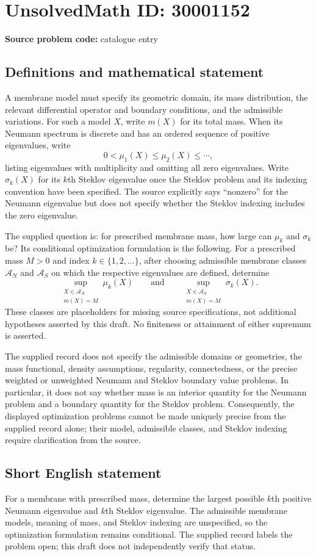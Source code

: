 \documentclass[11pt]{article}
\begin{document}
\section*{UnsolvedMath ID: 30001152}
\textbf{Source problem code:} catalogue entry
\subsection{Definitions and mathematical statement}
A membrane model must specify its geometric domain, its mass distribution, the relevant differential operator and boundary conditions, and the admissible variations. For such a model \(X\), write \(m(X)\) for its total mass. When its Neumann spectrum is discrete and has an ordered sequence of positive eigenvalues, write
\[
0<\mu_1(X)\leq\mu_2(X)\leq\cdots,
\]
listing eigenvalues with multiplicity and omitting all zero eigenvalues. Write \(\sigma_k(X)\) for its \(k\)th Steklov eigenvalue once the Steklov problem and its indexing convention have been specified. The source explicitly says ``nonzero'' for the Neumann eigenvalue but does not specify whether the Steklov indexing includes the zero eigenvalue.

The supplied question is: for prescribed membrane mass, how large can \(\mu_k\) and \(\sigma_k\) be? Its conditional optimization formulation is the following. For a prescribed mass \(M>0\) and index \(k\in\{1,2,\ldots\}\), after choosing admissible membrane classes \(\mathcal A_N\) and \(\mathcal A_S\) on which the respective eigenvalues are defined, determine
\[
\sup_{\substack{X\in\mathcal A_N\\m(X)=M}}\mu_k(X)
\qquad\text{and}\qquad
\sup_{\substack{X\in\mathcal A_S\\m(X)=M}}\sigma_k(X).
\]
These classes are placeholders for missing source specifications, not additional hypotheses asserted by this draft. No finiteness or attainment of either supremum is asserted.

The supplied record does not specify the admissible domains or geometries, the mass functional, density assumptions, regularity, connectedness, or the precise weighted or unweighted Neumann and Steklov boundary value problems. In particular, it does not say whether mass is an interior quantity for the Neumann problem and a boundary quantity for the Steklov problem. Consequently, the displayed optimization problems cannot be made uniquely precise from the supplied record alone; their model, admissible classes, and Steklov indexing require clarification from the source.
\subsection{Short English statement}
For a membrane with prescribed mass, determine the largest possible \(k\)th positive Neumann eigenvalue and \(k\)th Steklov eigenvalue. The admissible membrane models, meaning of mass, and Steklov indexing are unspecified, so the optimization formulation remains conditional. The supplied record labels the problem open; this draft does not independently verify that status.
\end{document}
